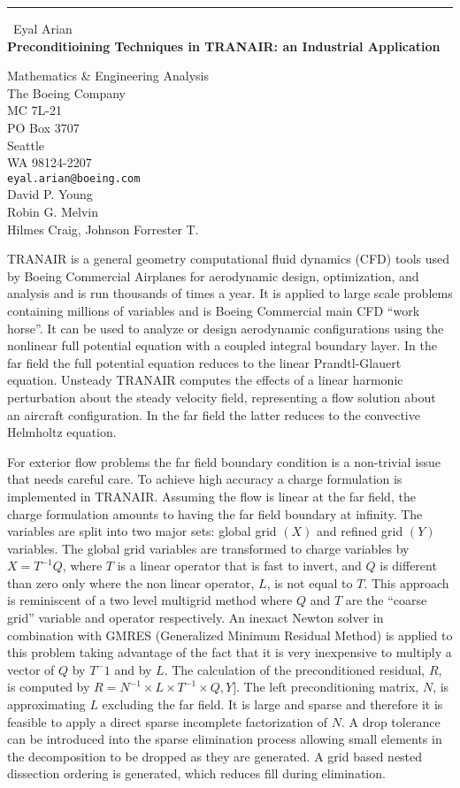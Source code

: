 \documentclass{report}
\begin{document}
\begin{center}
\rule{6in}{1pt} \
{\large Eyal Arian \\
{\bf Preconditioining Techniques in TRANAIR: an Industrial Application}}

Mathematics & Engineering Analysis \\ The Boeing Company \\ MC 7L-21         \\ PO Box 3707 \\ Seattle \\ WA 98124-2207
\\
{\tt eyal.arian@boeing.com}\\
David P. Young\\
Robin G. Melvin\\
	Hilmes Craig, Johnson Forrester T.\end{center}

TRANAIR is a general geometry computational fluid dynamics
(CFD) tools used by Boeing Commercial
Airplanes for aerodynamic design, optimization,
and analysis and is run thousands of times a year.
It is applied to large scale problems containing millions of
variables and is Boeing Commercial
main CFD ``work horse''. It can be used to analyze or design aerodynamic
configurations using the
nonlinear full potential equation with a coupled integral boundary layer.
In the far field the
full potential equation reduces to the linear Prandtl-Glauert equation.
Unsteady TRANAIR computes the effects of a linear harmonic perturbation
about the steady velocity field,
representing a flow solution about an aircraft configuration.
In the far field the latter reduces to
the convective Helmholtz equation.

For exterior flow problems the far field boundary condition is
a non-trivial issue that needs careful care.
To achieve high accuracy a charge formulation is implemented in TRANAIR.
Assuming the flow is linear at the far field, the charge formulation
amounts to having the far field
boundary at infinity. The variables are split into two major sets:
global grid $(X)$ and
refined grid $(Y)$ variables. The global grid variables are transformed
to charge variables by $X=T^{-1} Q$,
where $T$ is a linear operator that is fast to invert, and $Q$ is
different than zero only where the non
linear operator, $L$, is not equal to $T$. This approach is
reminiscent of a two level multigrid method
where $Q$ and $T$ are the ``coarse grid'' variable and operator respectively.
An inexact Newton solver in combination with GMRES
(Generalized Minimum Residual Method) is applied to
this problem taking advantage of the fact that it is very inexpensive
to multiply a
vector of $Q$ by $T^-1$ and by $L$.
The calculation of the preconditioned residual, $R$,
is computed by $R=N^{-1}\times L\times T^{-1}\times Q,Y]$. The left
preconditioning matrix, $N$,
is approximating $L$ excluding the far field. It is large and sparse and
therefore it is feasible to apply a
direct sparse incomplete factorization of $N$. A drop tolerance can be
introduced into the sparse
elimination process allowing small elements in the decomposition to be
dropped as they are generated.
A grid based nested dissection ordering is generated, which reduces
fill during elimination.
\end{document}
